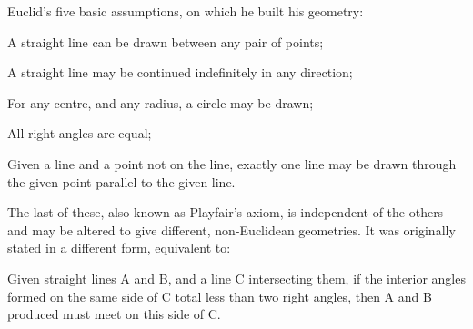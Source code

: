 Euclid's five basic assumptions, on which he built his geometry:
\par
A straight line can be drawn between any pair of points;
\par
A straight line may be continued indefinitely in any direction;
\par
For any centre, and any radius, a circle may be drawn;
\par
All right angles are equal;
\par
Given a line and a point not on the line, exactly one line may 
be drawn through the given point parallel to the given line.
\par
The last of these, also known as Playfair's axiom, is independent
of the others and may be altered to give different, non-Euclidean geometries.
It was originally stated in a different form, equivalent to:
\par
Given straight lines A and B, and a line C intersecting them, if
the interior angles formed on the same side of C total less than two 
right angles, then A and B produced must meet on this side of C.